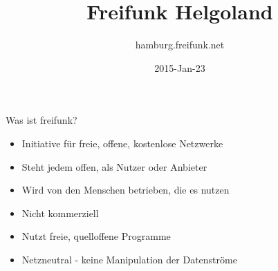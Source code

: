 \documentclass[t]{beamer}
\title{Freifunk Helgoland}
\author{hamburg.freifunk.net}
\date{2015-Jan-23}
\begin{document}
\maketitle

\begin{frame}{Was ist freifunk?}
	\begin{itemize}
		\item Initiative für freie, offene, kostenlose Netzwerke
		\item Steht jedem offen, als Nutzer oder Anbieter
		\item Wird von den Menschen betrieben, die es nutzen
		\item Nicht kommerziell
		\item Nutzt freie, quelloffene Programme
		\item Netzneutral - keine Manipulation der Datenströme		
	\end{itemize}
\end{frame}
\end{document}
